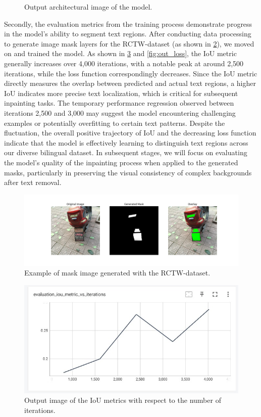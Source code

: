 \documentclass[10pt,twocolumn,letterpaper]{article}
\begin{document}
\begin{figure}[t]
    \caption{Output architectural image of the model.}
    \label{fig:model1}
\end{figure}

Secondly, the evaluation metrics from the training process demonstrate progress in the model's ability to segment text regions. 
After conducting data processing to generate image mask layers for the RCTW-dataset (as shown in \cref{fig:verify}), we moved on and trained the model. 
As shown in \cref{fig:out_iou} and \cref{fig:out_loss}, the IoU metric generally increases over 4,000 iterations, with a notable peak at around 2,500 iterations, 
while the loss function correspondingly decreases. Since the IoU metric directly measures the overlap between predicted and actual text regions, 
a higher IoU indicates more precise text localization, which is critical for subsequent inpainting tasks. The temporary performance regression observed 
between iterations 2,500 and 3,000 may suggest the model encountering challenging examples or potentially overfitting to certain text patterns. 
Despite the fluctuation, the overall positive trajectory of IoU and the decreasing loss function indicate that the model is effectively learning to 
distinguish text regions across our diverse bilingual dataset. In subsequent stages, we will focus on evaluating the model's quality of the inpainting 
process when applied to the generated masks, particularly in preserving the visual consistency of complex backgrounds after text removal.

\begin{figure}[t]
    \centering
    \includegraphics[width=\linewidth]{figures/milestone/verify_1.png}
    \caption{Example of mask image generated with the RCTW-dataset.}
    \label{fig:verify}
\end{figure}

\begin{figure}[t]
    \centering
    \includegraphics[width=\linewidth]{figures/milestone/out_iou.jpg}
    \caption{Output image of the IoU metrics with respect to the number of iterations. }
    \label{fig:out_iou}
\end{figure}
\end{document}
